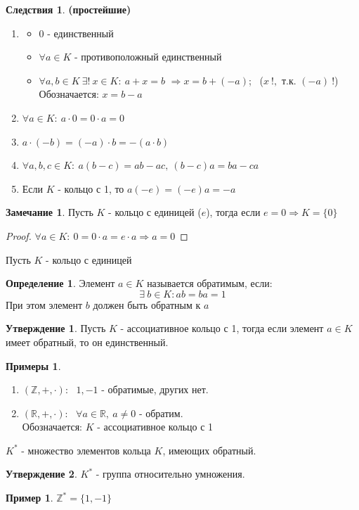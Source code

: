 \documentclass[a4paper, 12pt]{article}
\newcommand{\R}{\mathbb R}
\newcommand{\Z}{\mathbb Z}
\newcommand\tab[1][.5cm]{\hspace*{#1}}
\theoremstyle{definition}
\newtheorem*{definition}{Определение}
\newtheorem*{consequenses}{Следствия}
\newtheorem*{subtheorem}{Утверждение}
\newtheorem*{remark}{Замечание}
\newtheorem*{example}{Примеры}
\newtheorem*{example1}{Пример}
\begin{document}
  \begin{consequenses} \textbf{(простейшие)} 
    \begin{enumerate}
      \item \begin{itemize}
        \item $0$ - единственный
        \item $\forall a\in K$ - противоположный единственный
        \item $\forall a, b\in K \ \exists! \ x \in K: \ a+x=b$ $\Longrightarrow  x = b+(-a)$; \  ($x \ !,$ т.к. $(-a) \ !$) \\   
        Обозначается: $x = b-a$ 
      \end{itemize}
      \item $\forall a \in K: \ a \cdot 0=0 \cdot a = 0$
      \item $a\cdot(-b) = (-a)\cdot b = -(a\cdot b)$  
      \item $\forall a, b, c \in K: \ a(b-c) = ab-ac, \ (b-c)a = ba-ca$ 
      \item Если $K$ - кольцо с 1, то $a(-e) = (-e)a = -a$ 
    \end{enumerate}
  \end{consequenses}
  \begin{remark}
    Пусть $K$ - кольцо с единицей ($e$), тогда если $e = 0 \Longrightarrow K = \{0\}$ 
  \end{remark}
  \begin{proof}
    $\forall a \in K: \ 0 = 0 \cdot a= e \cdot a \Longrightarrow a = 0$ 
  \end{proof} 
  Пусть $K$ - кольцо с единицей 
  \begin{definition}
      Элемент $a \in K$ называется обратимым, если: $$\exists \ b \in K: ab =ba = 1$$ 
      При этом элемент $b$ должен быть обратным к $a$   
  \end{definition}  
  \begin{subtheorem}
    Пусть $K$ - ассоциативное кольцо с 1, тогда если элемент $a \in K$ имеет обратный, то он единственный.  
  \end{subtheorem} 
  \begin{example} \tab
    \begin{enumerate}
      \item $(\Z, +, \cdot)$: \  $1, -1$ - обратимые, других нет.
      \item $(\R, +, \cdot)$: \ $\forall a \in \R, \ a \neq 0$ - обратим. \\
      Обозначается: $K$ - ассоциативное кольцо с 1  
    \end{enumerate}
  \end{example}
  $K^*$ - множество элементов кольца $K$, имеющих обратный. 
  \begin{subtheorem}
    $K^*$ - группа относительно умножения. 
  \end{subtheorem}  
  \begin{example1}
    $\Z^* = \{1, -1\}$
  \end{example1}
\end{document}
